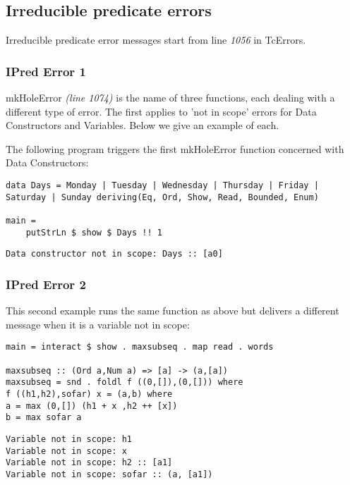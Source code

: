 \documentclass[a4paper]{article}
\begin{document}
\subsection{Irreducible predicate errors}

Irreducible predicate error messages start from line \textit{1056} in TcErrors.

\subsubsection{IPred Error 1}
mkHoleError \textit{(line 1074)}  is the name of three functions, each dealing with a different type of error. The first applies to 'not in scope' errors for Data Constructors and Variables. Below we give an example of each.

The following program triggers the first mkHoleError function concerned with Data Constructors:

\begin{lstlisting}[label={lst: T1.0}, numbers=none, caption={Example Program \cite{ex1}}]
data Days = Monday | Tuesday | Wednesday | Thursday | Friday | Saturday | Sunday deriving(Eq, Ord, Show, Read, Bounded, Enum)

main =
    putStrLn $ show $ Days !! 1
\end{lstlisting}

\begin{lstlisting}[label={lst: T1.0.1}, numbers=none, caption={Error}]
    Data constructor not in scope: Days :: [a0]
\end{lstlisting}

\subsubsection{IPred Error 2}
This second example runs the same function as above but delivers a different message when it is a variable not in scope:

\begin{lstlisting}[label={lst: T2.0}, numbers=none, caption={Example Program \cite{ex2}}]
main = interact $ show . maxsubseq . map read . words

maxsubseq :: (Ord a,Num a) => [a] -> (a,[a])
maxsubseq = snd . foldl f ((0,[]),(0,[])) where 
f ((h1,h2),sofar) x = (a,b) where
a = max (0,[]) (h1 + x ,h2 ++ [x]) 
b = max sofar a
\end{lstlisting}

\begin{lstlisting}[label={lst: T2.0.2}, numbers=none, caption={Error}]
Variable not in scope: h1
Variable not in scope: x
Variable not in scope: h2 :: [a1]
Variable not in scope: sofar :: (a, [a1])
\end{lstlisting}
\end{document}
